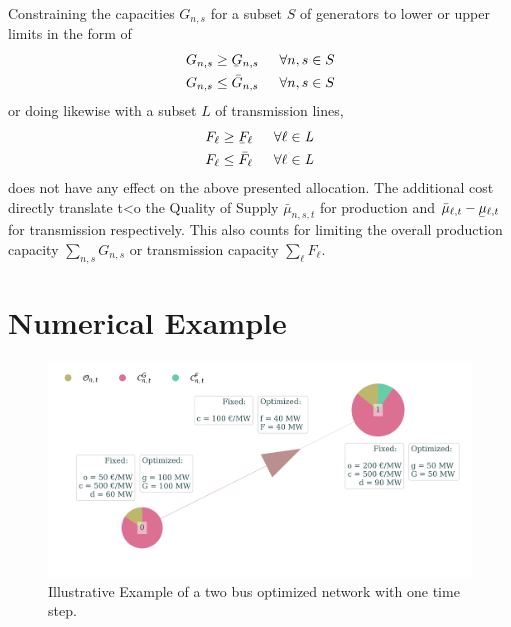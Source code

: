 \documentclass[11pt,twocolumn]{article}
\newcommand{\ubar}[1]{\underaccent{\bar}{#1}}
\newcommand{\hpad}{\hspace{15pt}}
\newcommand{\capacityGeneration}{G_{n,s}}
\newcommand{\capacityGenerationUpper}{\bar{G}_{n,s}}
\newcommand{\capacityGenerationLower}{\ubar{G}_{n,s}}
\newcommand{\capacityFlow}{F_{\ell}}
\newcommand{\capacityFlowUpper}{\bar{F}_{\ell}}
\newcommand{\capacityFlowLower}{\ubar{F}_{\ell}}
\newcommand{\muuppergeneration}[1][n]{\bar{\mu}_{#1,s,t}}
\newcommand{\mulowerflow}{\ubar{\mu}_{\ell,t}}
\newcommand{\muupperflow}{\bar{\mu}_{\ell,t}}
\begin{document}
Constraining the capacities $\capacityGeneration$  for a subset $S$ of generators to lower or upper limits in the form of 
\begin{align}
 \capacityGeneration \ge \capacityGenerationLower \hpad \forall{n,s \in S} \\
 \capacityGeneration \le \capacityGenerationUpper \hpad \forall{n,s \in S}
\end{align}
or doing likewise with a subset $L$ of transmission lines,
\begin{align}
 \capacityFlow \ge \capacityFlowLower \hpad \forall{\ell \in \textit{L}} \\
 \capacityFlow \le \capacityFlowUpper \hpad \forall{\ell \in \textit{L}}
\end{align}
does not have any effect on the above presented allocation. The additional cost directly translate t<o the Quality of Supply $\muuppergeneration$ for production and $\muupperflow - \mulowerflow$ for transmission respectively. This also counts for limiting the overall production capacity $\sum_{n,s}\capacityGeneration$ or transmission capacity $\sum_\ell \capacityFlow$. 

\section{Numerical Example}

\begin{figure}[h]
\centering
 \includegraphics[width=\linewidth]{example_network_constraint_capacity.png}
 \caption{Illustrative Example of a two bus optimized network with one time step. }
 \label{fig:example_network}
\end{figure}
\end{document}
